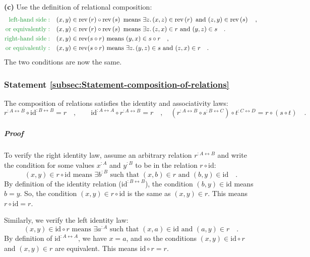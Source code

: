 \textbf{(c)} Use the definition of relational composition:
\begin{align*}
{\color{greenunder}\text{left-hand side}:}\quad & (x,y)\in\text{rev}\left(r\right)\circ\text{rev}\left(s\right)\text{ means }\exists z.\,(x,z)\in\text{rev}\left(r\right)\text{ and }(z,y)\in\text{rev}\left(s\right)\quad,\\
{\color{greenunder}\text{or equivalently}:}\quad & (x,y)\in\text{rev}\left(r\right)\circ\text{rev}\left(s\right)\text{ means }\exists z.\,(z,x)\in r\text{ and }(y,z)\in s\quad.\\
{\color{greenunder}\text{right-hand side}:}\quad & (x,y)\in\text{rev}(s\circ r)\text{ means }(y,x)\in s\circ r\quad,\\
{\color{greenunder}\text{or equivalently}:}\quad & (x,y)\in\text{rev}(s\circ r)\text{ means }\exists z.\,(y,z)\in s\text{ and }(z,x)\in r\quad.
\end{align*}
The two conditions are now the same.

\subsubsection{Statement \label{subsec:Statement-composition-of-relations}\ref{subsec:Statement-composition-of-relations}}

The composition of relations satisfies the identity and associativity
laws:
\[
r^{:A\leftrightarrow B}\circ\text{id}^{:B\leftrightarrow B}=r\quad,\quad\quad\text{id}^{:A\leftrightarrow A}\circ r^{:A\leftrightarrow B}=r\quad,\quad(r^{:A\leftrightarrow B}\circ s^{:B\leftrightarrow C})\circ t^{:C\leftrightarrow D}=r\circ(s\circ t)\quad.
\]


\subparagraph{Proof}

To verify the right identity law, assume an arbitrary relation $r^{:A\leftrightarrow B}$
and write the condition for some values $x^{:A}$ and $y^{:B}$ to
be in the relation $r\circ\text{id}$:
\[
(x,y)\in r\circ\text{id}\text{ means }\exists b^{:B}\text{ such that }(x,b)\in r\text{ and }(b,y)\in\text{id}\quad.
\]
By definition of the identity relation ($\text{id}^{:B\leftrightarrow B}$),
the condition $(b,y)\in\text{id}$ means $b=y$. So, the condition
$(x,y)\in r\circ\text{id}$ is the same as $(x,y)\in r$. This means
$r\circ\text{id}=r$.

Similarly, we verify the left identity law:
\[
(x,y)\in\text{id}\circ r\text{ means }\exists a^{:A}\text{ such that }(x,a)\in\text{id}\text{ and }(a,y)\in r\quad.
\]
By definition of $\text{id}^{:A\leftrightarrow A}$, we have $x=a$,
and so the conditions $(x,y)\in\text{id}\circ r$ and $(x,y)\in r$
are equivalent. This means $\text{id}\circ r=r$.

